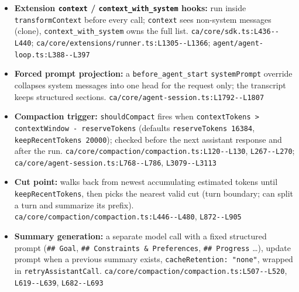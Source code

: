 \begin{itemize}
\item \textbf{Extension \texttt{context} / \texttt{context\_\allowbreak{}with\_\allowbreak{}system} hooks:} run inside \texttt{transformContext} before every call; \texttt{context} sees non-system messages (clone), \texttt{context\_\allowbreak{}with\_\allowbreak{}system} owns the full list. \texttt{ca/\allowbreak{}core/\allowbreak{}sdk.\allowbreak{}ts:\allowbreak{}L436-\allowbreak{}-\allowbreak{}L440}; \texttt{ca/\allowbreak{}core/\allowbreak{}extensions/\allowbreak{}runner.\allowbreak{}ts:\allowbreak{}L1305-\allowbreak{}-\allowbreak{}L1366}; \texttt{agent/\allowbreak{}agent-\allowbreak{}loop.\allowbreak{}ts:\allowbreak{}L388-\allowbreak{}-\allowbreak{}L397}
\item \textbf{Forced prompt projection:} a \texttt{before\_\allowbreak{}agent\_\allowbreak{}start} \texttt{systemPrompt} override collapses system messages into one head for the request only; the transcript keeps structured sections. \texttt{ca/\allowbreak{}core/\allowbreak{}agent-\allowbreak{}session.\allowbreak{}ts:\allowbreak{}L1792-\allowbreak{}-\allowbreak{}L1807}
\item \textbf{Compaction trigger:} \texttt{shouldCompact} fires when \texttt{contextTokens > contextWindow -\allowbreak{} reserveTokens} (defaults \texttt{reserveTokens 16384}, \texttt{keepRecentTokens 20000}); checked before the next assistant response and after the run. \texttt{ca/\allowbreak{}core/\allowbreak{}compaction/\allowbreak{}compaction.\allowbreak{}ts:\allowbreak{}L120-\allowbreak{}-\allowbreak{}L130}, \texttt{L267-\allowbreak{}-\allowbreak{}L270}; \texttt{ca/\allowbreak{}core/\allowbreak{}agent-\allowbreak{}session.\allowbreak{}ts:\allowbreak{}L768-\allowbreak{}-\allowbreak{}L786}, \texttt{L3079-\allowbreak{}-\allowbreak{}L3113}
\item \textbf{Cut point:} walks back from newest accumulating estimated tokens until \texttt{keepRecentTokens}, then picks the nearest valid cut (turn boundary; can split a turn and summarize its prefix). \texttt{ca/\allowbreak{}core/\allowbreak{}compaction/\allowbreak{}compaction.\allowbreak{}ts:\allowbreak{}L446-\allowbreak{}-\allowbreak{}L480}, \texttt{L872-\allowbreak{}-\allowbreak{}L905}
\item \textbf{Summary generation:} a separate model call with a fixed structured prompt (\texttt{\#\# Goal}, \texttt{\#\# Constraints \& Preferences}, \texttt{\#\# Progress} \ldots{}), update prompt when a previous summary exists, \texttt{cacheRetention:\allowbreak{} "none"}, wrapped in \texttt{retryAssistantCall}. \texttt{ca/\allowbreak{}core/\allowbreak{}compaction/\allowbreak{}compaction.\allowbreak{}ts:\allowbreak{}L507-\allowbreak{}-\allowbreak{}L520}, \texttt{L619-\allowbreak{}-\allowbreak{}L639}, \texttt{L682-\allowbreak{}-\allowbreak{}L693}

\end{itemize}
